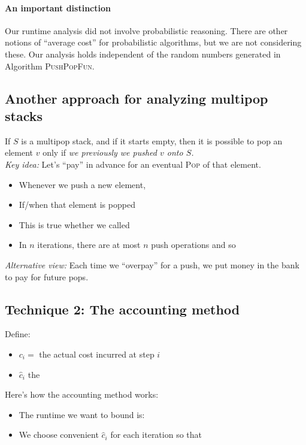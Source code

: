 \documentclass[11  pt]{article}
\begin{document}
\pagebreak

\paragraph{An important distinction}
Our runtime analysis did not involve probabilistic reasoning. There are other notions of ``average cost'' for probabilistic algorithms, but we are not considering these. Our analysis holds independent of the random numbers generated in Algorithm \textsc{PushPopFun}.

\newpage

\subsection{Another approach for analyzing multipop stacks}
If $S$ is a multipop stack, and if it starts empty, then it is possible to pop an element $v$ only if \emph{we previously we pushed $v$ onto $S$.}\\

\emph{Key idea:} Let's ``pay'' in advance for an eventual \textsc{Pop} of that element.
\begin{itemize}
	\item Whenever we push a new element,\\ %
	\item If/when that element is popped  \\
	\item This is true whether we called \\
	
	
	\item In $n$ iterations, there are at most $n$ push operations and so 
\end{itemize}

\emph{Alternative view:} Each time we ``overpay'' for a push, we put money in the bank to pay for future pops.



\newpage
\subsection{Technique 2: The accounting method}
Define:
\begin{itemize}
	\item $c_i = $ the actual cost incurred at step $i$ 
	\item $\hat{c}_i$ the 
\end{itemize}
Here's how the accounting method works:
\begin{itemize}
	\item The runtime we want to bound is:\\ %
	\item We choose convenient $\hat{c}_i$ for each iteration so that
	\vs{3cm}
\end{itemize}
\end{document}
